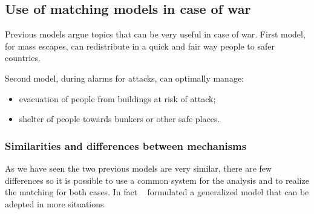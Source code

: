 \subsection{Use of matching models in case of war}\label{use-of-matching-model-in-case-of-war}%
Previous models argue topics that can be very useful in case of war. First model, for mass escapes, can redistribute in a quick and fair way people to safer countries.

Second model, during alarms for attacks, can optimally manage:
\begin{itemize}
    \item evacuation of people from buildings at risk of attack;
    \item shelter of people towards bunkers or other safe places.
\end{itemize}


\subsubsection{Similarities and differences between mechanisms}\label{similarities-and-differences-between-mechanisms}

As we have seen the two previous models are very similar, there are few differences so it is possible to use a
common system for the analysis and to realize the matching for both cases.
In fact ~\citet{delacretaz_2020} formulated a generalized model that can be adepted in more situations.
%
